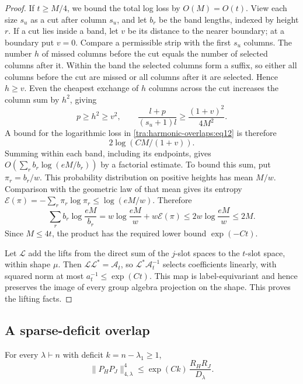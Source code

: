 \begin{proof}
If \(t\ge M/4\), we bound the total log loss by \(O(M)=O(t)\). View each size \(s_u\) as a cut after column \(s_u\), and let \(b_r\) be the band lengths, indexed by height \(r\). If a cut lies inside a band, let \(v\) be its distance to the nearer boundary; at a boundary put \(v=0\). Compare a permissible strip with the first \(s_u\) columns. The number \(h\) of missed columns before the cut equals the number of selected columns after it. Within the band the selected columns form a suffix, so either all columns before the cut are missed or all columns after it are selected. Hence \(h\ge v\). Even the cheapest exchange of \(h\) columns across the cut increases the column sum by \(h^2\), giving
\[
 p\ge h^2\ge v^2,\qquad
 \frac{l+p}{(s_u+1)l}\ge\frac{(1+v)^2}{4M^2}.
\]
A bound for the logarithmic loss in \eqref{tra:harmonic-overlaps:eq12} is therefore
\[
                         2\log(CM/(1+v)).
\]
Summing within each band, including its endpoints, gives \(O(\sum_r b_r\log(eM/b_r))\) by a factorial estimate. To bound this sum, put \(\pi_r=b_r/w\). This probability distribution on positive heights has mean \(M/w\). Comparison with the geometric law of that mean gives its entropy \(\mathcal E(\pi)=-\sum_r\pi_r\log\pi_r\le\log(eM/w)\). Therefore
\[
 \sum_r b_r\log\frac{eM}{b_r}
 =w\log\frac{eM}{w}+w\mathcal E(\pi)
 \le2w\log\frac{eM}{w}\le2M.
\]
Since \(M\le4t\), the product has the required lower bound \(\exp(-Ct)\).

Let \(\mathcal L\) add the lifts from the direct sum of the \(j\)-slot spaces to the \(t\)-slot space, within shape \(\mu\). Then \(\mathcal L\mathcal L^*=\mathcal A_t\), so \(\mathcal L^*\mathcal A_t^{-1}\) selects coefficients linearly, with squared norm at most \(a_t^{-1}\le\exp(Ct)\). This map is label-equivariant and hence preserves the image of every group algebra projection on the shape. This proves the lifting facts.

\end{proof}

\subsection{A sparse-deficit overlap}

\begin{proposition}\label{tra:harmonic-overlaps:sparse-overlap}

\label{tra:harmonic-overlaps:sparse-overlap-statement}
For every \(\lambda\vdash n\) with deficit \(k=n-\lambda_1\ge 1\),
\begin{equation}
              \|P_H P_J\|_{4,\lambda}^4
                    \le \exp(C k)\,\frac{R_H R_J}{D_\lambda}.             \label{tra:harmonic-overlaps:eq13}
\end{equation}
\end{proposition}

